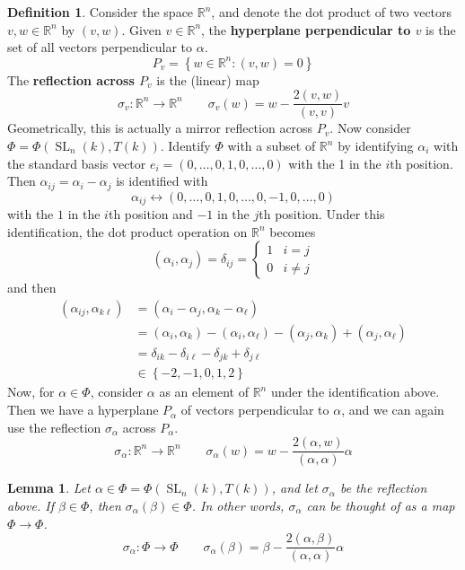 \documentclass[12pt]{article}
\newtheorem{lemma}[theorem]{Lemma}
\theoremstyle{definition}
\newtheorem{definition}[theorem]{Definition}
\numberwithin{theorem}{subsection}
\newcommand{\R}{\mathbb{R}}
\newcommand{\sig}{\sigma}
\newcommand{\lb}{\left\{}
\newcommand{\rb}{\right\}}
\newcommand{\tbf}{\textbf}
\DeclareMathOperator{\SL}{SL}
\begin{document}
\begin{definition}
Consider the space $\R^n$, and denote the dot product of two vectors $v, w \in \R^n$ by $(v, w)$. Given $v \in \R^n$, the \tbf{hyperplane perpendicular to $v$} is the set of all vectors perpendicular to $\alpha$.
\[
	P_v = \lb w \in \R^n : (v,w) = 0 \rb
\]
The \tbf{reflection across $P_v$} is the (linear) map
\[
	\sig_v:\R^n \to \R^n \qquad \sig_v(w) = w - \frac{2 (v,w)}{(v,v)} v
\]
Geometrically, this is actually a mirror reflection across $P_v$. Now consider $\Phi = \Phi(\SL_n(k), T(k))$. Identify $\Phi$ with a subset of $\R^n$ by identifying $\alpha_i$ with the standard basis vector $e_i = (0,  \ldots, 0, 1, 0, \ldots, 0)$ with the 1 in the $i$th position. Then $\alpha_{ij} = \alpha_i - \alpha_j$ is identified with
\[
	\alpha_{ij} \leftrightarrow (0, \ldots, 0, 1, 0, \ldots, 0, -1, 0, \ldots ,0)
\]
with the $1$ in the $i$th position and $-1$ in the $j$th position. Under this identification, the dot product operation on $\R^n$ becomes
\[
	(\alpha_i, \alpha_j) = \delta_{ij} =
	\begin{cases}
		1 & i = j \\
		0 & i \neq j
	\end{cases}
\]
and then
\begin{align*}
	(\alpha_{ij}, \alpha_{k\ell}) &= (\alpha_i - \alpha_j, \alpha_k - \alpha_\ell) \\
	&= (\alpha_i, \alpha_k) - (\alpha_i, \alpha_{\ell}) - (\alpha_j, \alpha_k) + (\alpha_{j}, \alpha_\ell) \\
	&= \delta_{ik} - \delta_{i\ell} - \delta_{jk} + \delta_{j\ell} \\
	&\in \lb -2, -1, 0, 1, 2 \rb
\end{align*}
Now, for $\alpha \in \Phi$, consider $\alpha$ as an element of $\R^n$ under the identification above. Then we have a hyperplane $P_\alpha$ of vectors perpendicular to $\alpha$, and we can again use the reflection $\sig_\alpha$ across $P_\alpha$.
\[
	\sig_\alpha:\R^n \to \R^n \qquad \sig_\alpha(w) = w - \frac{2 (\alpha,w)}{(\alpha,\alpha)} \alpha
\]
\end{definition}

\begin{lemma}
Let $\alpha \in \Phi = \Phi(\SL_n(k), T(k))$, and let $\sig_\alpha$ be the reflection above. If $\beta \in \Phi$, then $\sig_\alpha(\beta) \in \Phi$. In other words, $\sig_\alpha$ can be thought of as a map $\Phi \to \Phi$.
\[
	\sig_\alpha:\Phi \to \Phi \qquad \sig_\alpha(\beta) = \beta - \frac{2 (\alpha,\beta)}{(\alpha,\alpha)} \alpha
\]
\end{lemma}
\end{document}
